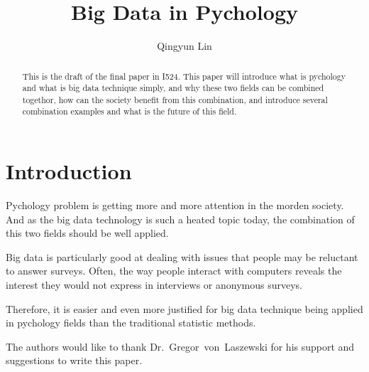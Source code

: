 
\title{Big Data in Pychology}


\author{Qingyun Lin}


\renewcommand{\shortauthors}{G. v. Laszewski}


\begin{abstract}
This is the draft of the final paper in I524. This paper will introduce what is pychology and what is big data technique simply, and why these two fields can be combined togethor, how can the society benefit from this combination, and introduce several combination examples and what is the future of this field.
\end{abstract}



\maketitle

\section{Introduction}

Pychology problem is getting more and more attention in the morden society. And as the big data technology is such a heated topic today, the combination of this two fields should be well applied.

Big data is particularly good at dealing with issues that people may be reluctant to answer surveys. Often, the way people interact with computers reveals the interest they would not express in interviews or anonymous surveys\cite{editor00}.

Therefore, it is easier and even more justified for big data technique being applied in pychology fields than the traditional statistic methods.

\begin{acks}

  The authors would like to thank Dr.~Gregor~von~Laszewski for his
  support and suggestions to write this paper.

\end{acks}



 

